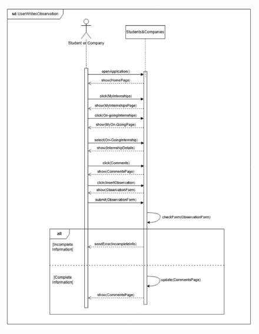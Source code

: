 \documentclass{article}
\begin{document}
\begin{figure}[H]
    \centering
    \includegraphics[scale = 0.9]{figures/UseCasesSD/UserWritesObservationSD.png}
\end{figure}
\newpage
\end{document}
